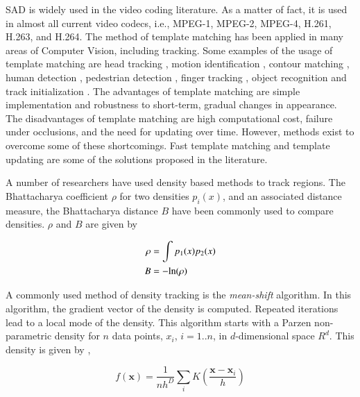 \begin{Body}
SAD is widely used in the video coding literature.  As a matter of fact, it is used in almost all current video codecs, i.e., MPEG-1, MPEG-2, MPEG-4, H.261, H.263, and H.264.  The method of template matching has been applied in many areas of Computer Vision, including tracking.  Some examples of the usage of template matching are head tracking \cite{1998_CNF_HeadTracking_Birchfield}, motion identification \cite{1998_CNF_Tracking_Lipton, 2001_JNL_MotionTemplates_Bobick}, contour matching \cite{2009_CNF_HumanDetection_Beleznai}, human detection \cite{2010_JNL_HumanDetectionSegmentation_Lin}, pedestrian detection \cite{1997_CNF_PedestrianDetection_Oren}, finger tracking \cite{1995_CNF_Tracking_Rehg}, object recognition \cite{2000_CNF_MLtemplateMatching_Olson} and track initialization \cite{1998_CNF_Tracking_Lipton, 2010_CNF_TrkRVQ_Aslam}.  The advantages of template matching are simple implementation and robustness to short-term, gradual changes in appearance.  The disadvantages of template matching are high computational cost, failure under occlusions, and the need for updating over time.  However, methods exist to overcome some of these shortcomings.  Fast template matching \cite{2002_CNF_FastTemplateMatching_SchweitzerBellWu} and template updating are some of the solutions \cite{1998_CNF_Tracking_Lipton} proposed in the literature.

A number of researchers have used density based methods to track regions.  The Bhattacharya coefficient $\rho$ for two densities $p_i(x)$, and an associated distance measure, the Bhattacharya distance $B$ \cite{1967_JNL_Bhattacharyya_Kailath} have been commonly used to compare densities.  $\rho$ and $B$ are given by 

\begin{align}
\rho &= \int p_1(x)p_2(x) \notag\\
B &= -\text{ln}(\rho)
\label{Eq:Bhattacharya}
\end{align}

A commonly used method of density tracking is the \emph{mean-shift} algorithm.  In this algorithm, the gradient vector of the density is computed.  Repeated iterations lead to a local mode of the density.  This algorithm starts with a Parzen non-parametric density for $n$ data points, $x_i$, $i=1..n$, in $d$-dimensional space $R^d$.  This density is given by \cite{2007_BOOK_PRML_Bishop},

\begin{equation}
f(\mathbf{x}) = \frac{1}{nh^D}\sum_i K(\frac{\mathbf{x}-\mathbf{x}_i}{h})
\label{Eq:ParzenDensity}
\end{equation} 


\end{Body}
